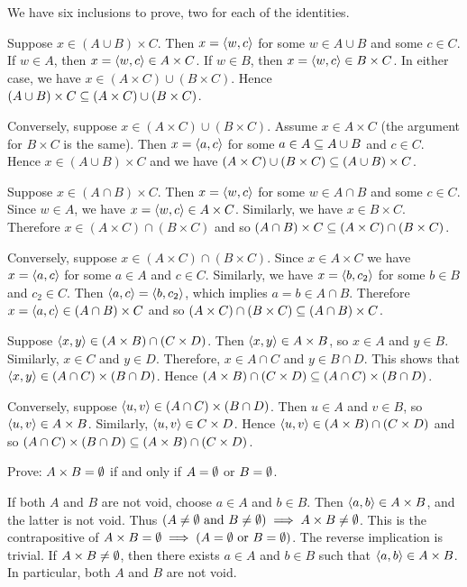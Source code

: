 \documentclass{report}
\renewcommand*{\land}{\text{ and }}
\renewcommand*{\lor}{\text{ or }}
\begin{document}
\begin{solution}
We have six inclusions to prove, two for each of the identities.

Suppose $x\in (A\cup B)\times C$. Then $x=\left\langle w, c\right\rangle$ for some $w\in A\cup B$ and some $c\in C$.
If $w\in A$, then $x=\left\langle w, c\right\rangle\in A\times C$. If $w\in B$, then $x=\left\langle w, c\right\rangle\in B\times C$.
In either case, we have $x\in (A\times C)\cup (B\times C)$.
Hence $(A\cup B)\times C \subseteq (A\times C)\cup (B\times C)$.

Conversely, suppose $x\in (A\times C)\cup (B\times C)$. Assume $x\in A\times C$ (the argument for $B\times C$ is the same).
Then $x=\left\langle a,c\right\rangle$ for some $a\in A\subseteq A\cup B$ and $c\in C$.
Hence $x\in (A\cup B)\times C$ and we have $(A\times C)\cup (B\times C) \subseteq (A\cup B)\times C$.

Suppose $x\in (A\cap B)\times C$. Then $x=\left\langle w, c\right\rangle$ for some $w\in A\cap B$ and some $c\in C$.
Since $w\in A$, we have $x=\left\langle w, c\right\rangle\in A\times C$. Similarly, we have $x\in B\times C$.
Therefore $x\in (A\times C)\cap (B\times C)$ and so $(A\cap B)\times C \subseteq (A\times C)\cap (B\times C)$.

Conversely, suppose $x\in (A\times C)\cap (B\times C)$. Since $x\in A\times C$ we have $x=\left\langle a,c\right\rangle$ for
some $a\in A$ and $c\in C$.
Similarly, we have $x=\left\langle b,c_2\right\rangle$ for some $b\in B$ and $c_2\in C$.
Then $\left\langle a,c\right\rangle=\left\langle b,c_2\right\rangle$, which implies $a=b\in A\cap B$.
Therefore $x=\left\langle a,c\right\rangle\in (A\cap B)\times C$ and so $(A\times C)\cap (B\times C)\subseteq (A\cap B)\times C$.

Suppose $\left\langle x, y\right\rangle \in (A \times B)\cap (C \times D)$. Then $\left\langle x, y\right\rangle\in A\times B$,
so $x\in A$ and $y \in B$. Similarly, $x \in C$ and $y\in D$.
Therefore, $x\in A\cap C$ and $y\in B\cap D$.
This shows that $\left\langle x, y\right\rangle\in(A\cap C)\times (B\cap D)$.
Hence $(A \times B)\cap (C \times D) \subseteq (A\cap C)\times (B\cap D)$.

Conversely, suppose $\left\langle u,v\right\rangle\in (A\cap C)\times (B\cap D)$.
Then $u\in A$ and $v\in B$, so $\left\langle u,v\right\rangle\in A\times B$. Similarly, $\left\langle u,v\right\rangle\in C\times D$.
Hence $\left\langle u,v\right\rangle\in (A\times B)\cap (C\times D)$ and so
$(A\cap C)\times (B\cap D)\subseteq (A\times B)\cap (C\times D)$.
\end{solution}

\begin{exercise}
Prove: $A\times B = \emptyset$ if and only if $A=\emptyset$ or $B=\emptyset$.
\end{exercise}

\begin{solution}
If both $A$ and $B$ are not void, choose $a \in A$ and $b\in B$. Then $\left\langle a,b\right\rangle\in A \times B$,
and the latter is not void. Thus $(A\neq\eset \land B\neq\eset)\implies A\times B\neq\eset$.
This is the contrapositive of $A\times B = \eset\implies (A=\eset\lor B=\eset)$.
The reverse implication is trivial. If $A\times B\neq \emptyset$, then there exists $a\in A$
and $b\in B$ such that $\left\langle a,b\right\rangle\in A\times B$. In particular, both $A$ and $B$ are not void.

\end{solution}
\end{document}
